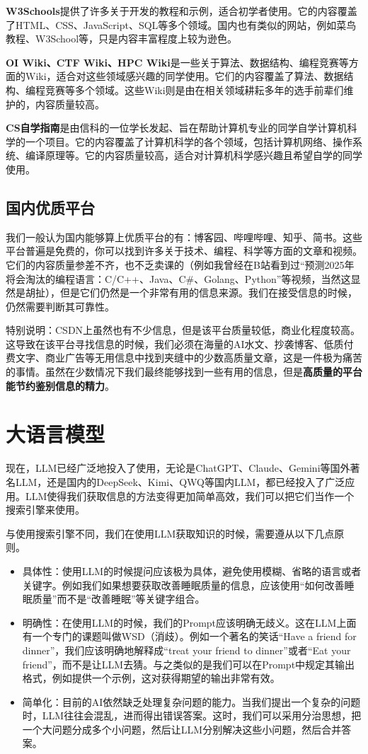 \documentclass[../main.tex]{subfiles}
\begin{document}
\textbf{W3Schools}提供了许多关于开发的教程和示例，适合初学者使用。它的内容覆盖了HTML、CSS、JavaScript、SQL等多个领域。国内也有类似的网站，例如菜鸟教程、W3School等，只是内容丰富程度上较为逊色。

\textbf{OI Wiki、CTF Wiki、HPC Wiki}是一些关于算法、数据结构、编程竞赛等方面的Wiki，适合对这些领域感兴趣的同学使用。它们的内容覆盖了算法、数据结构、编程竞赛等多个领域。这些Wiki则是由在相关领域耕耘多年的选手前辈们维护的，内容质量较高。

\textbf{CS自学指南}是由信科的一位学长发起、旨在帮助计算机专业的同学自学计算机科学的一个项目。它的内容覆盖了计算机科学的各个领域，包括计算机网络、操作系统、编译原理等。它的内容质量较高，适合对计算机科学感兴趣且希望自学的同学使用。

\subsection{国内优质平台}

我们一般认为国内能够算上优质平台的有：博客园、哔哩哔哩、知乎、简书。这些平台普遍是免费的，你可以找到许多关于技术、编程、科学等方面的文章和视频。它们的内容质量参差不齐，也不乏卖课的（例如我曾经在B站看到过“预测2025年将会淘汰的编程语言：C/C++、Java、C\#、Golang、Python”等视频，当然这显然是胡扯），但是它们仍然是一个非常有用的信息来源。我们在接受信息的时候，仍然需要判断其可靠性。

特别说明：CSDN上虽然也有不少信息，但是该平台质量较低，商业化程度较高。这导致在该平台寻找信息的时候，我们必须在海量的AI水文、抄袭博客、低质付费文字、商业广告等无用信息中找到夹缝中的少数高质量文章，这是一件极为痛苦的事情。虽然在少数情况下我们最终能够找到一些有用的信息，但是\textbf{高质量的平台能节约鉴别信息的精力}。

\section{大语言模型}

现在，LLM已经广泛地投入了使用，无论是ChatGPT、Claude、Gemini等国外著名LLM，还是国内的DeepSeek、Kimi、QWQ等国内LLM，都已经投入了广泛应用。LLM使得我们获取信息的方法变得更加简单高效，我们可以把它们当作一个搜索引擎来使用。

与使用搜索引擎不同，我们在使用LLM获取知识的时候，需要遵从以下几点原则。

\begin{itemize}
    \item 具体性：使用LLM的时候提问应该极为具体，避免使用模糊、省略的语言或者关键字。例如我们如果想要获取改善睡眠质量的信息，应该使用“如何改善睡眠质量”而不是“改善睡眠”等关键字组合。
    \item 明确性：在使用LLM的时候，我们的Prompt应该明确无歧义。这在LLM上面有一个专门的课题叫做WSD（消歧）。例如一个著名的笑话“Have a friend for dinner”，我们应该明确地解释成“treat your friend to dinner”或者“Eat your friend”，而不是让LLM去猜。与之类似的是我们可以在Prompt中规定其输出格式，例如提供一个示例，这对获得期望的输出非常有效。
    \item 简单化：目前的AI依然缺乏处理复杂问题的能力。当我们提出一个复杂的问题时，LLM往往会混乱，进而得出错误答案。这时，我们可以采用分治思想，把一个大问题分成多个小问题，然后让LLM分别解决这些小问题，然后合并答案。
\end{itemize}
\end{document}
